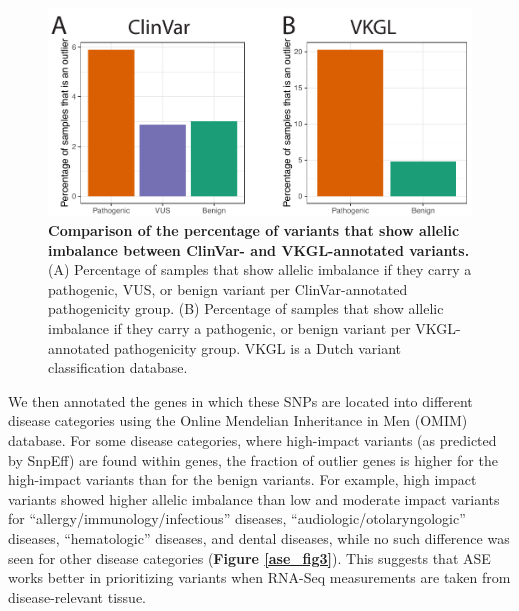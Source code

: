 \begin{figure}[h!]
	\includegraphics[width=\textwidth]{chapters/chapter3-allele-specific-expression/img/fig2.pdf}
	\caption{\textbf{Comparison of the percentage of variants that show allelic imbalance between ClinVar- and VKGL-annotated variants.} (A) Percentage of samples that show allelic imbalance if they carry a pathogenic, VUS, or benign variant per ClinVar-annotated pathogenicity group. (B) Percentage of samples that show allelic imbalance if they carry a pathogenic, or benign variant per VKGL-annotated pathogenicity group. VKGL is a Dutch variant classification database. }
	\label{ase_fig2}
\end{figure}


We then annotated the genes in which these SNPs are located into different disease categories using the Online Mendelian Inheritance in Men (OMIM) database\cite{hamoshOnlineMendelianInheritance2000}. For some disease categories, where high-impact variants (as predicted by SnpEff\cite{cingolaniProgramAnnotatingPredicting2012}) are found within genes, the fraction of outlier genes is higher for the high-impact variants than for the benign variants. For example, high impact variants showed higher allelic imbalance than low and moderate impact variants for “allergy/immunology/infectious” diseases, “audiologic/otolaryngologic” diseases, “hematologic” diseases, and dental diseases, while no such difference was seen for other disease categories (\textbf{Figure \ref{ase_fig3}}). This suggests that ASE works better in prioritizing variants when RNA-Seq measurements are taken from disease-relevant tissue. 

